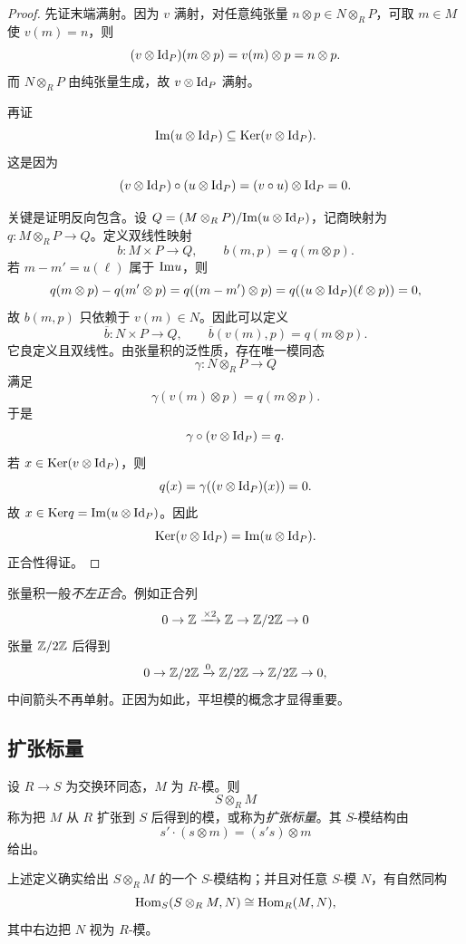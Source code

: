 \begin{proof}
先证末端满射。因为 $v$ 满射，对任意纯张量 $n\otimes p\in N\otimes_R P$，可取 $m\in M$ 使 $v(m)=n$，则
\[
(v\otimes \mathrm{Id}_P)(m\otimes p)=v(m)\otimes p=n\otimes p.
\]
而 $N\otimes_R P$ 由纯张量生成，故 $v\otimes \mathrm{Id}_P$ 满射。

再证
\[
\mathrm{Im}(u\otimes \mathrm{Id}_P)\subseteq \mathrm{Ker}(v\otimes \mathrm{Id}_P).
\]
这是因为
\[
(v\otimes \mathrm{Id}_P)\circ (u\otimes \mathrm{Id}_P)=(v\circ u)\otimes \mathrm{Id}_P=0.
\]

关键是证明反向包含。设 $Q=(M\otimes_R P)/\mathrm{Im}(u\otimes \mathrm{Id}_P)$，记商映射为 $q\colon M\otimes_R P\to Q$。定义双线性映射
\[
b\colon M\times P\to Q,
\qquad b(m,p)=q(m\otimes p).
\]
若 $m-m'=u(\ell)$ 属于 $\mathrm{Im} u$，则
\[
q(m\otimes p)-q(m'\otimes p)=q((m-m')\otimes p)=q((u\otimes \mathrm{Id}_P)(\ell\otimes p))=0,
\]
故 $b(m,p)$ 只依赖于 $v(m)\in N$。因此可以定义
\[
\overline b\colon N\times P\to Q,
\qquad \overline b(v(m),p)=q(m\otimes p).
\]
它良定义且双线性。由张量积的泛性质，存在唯一模同态
\[
\gamma\colon N\otimes_R P\to Q
\]
满足
\[
\gamma(v(m)\otimes p)=q(m\otimes p).
\]
于是
\[
\gamma\circ (v\otimes \mathrm{Id}_P)=q.
\]
若 $x\in \mathrm{Ker}(v\otimes \mathrm{Id}_P)$，则
\[
q(x)=\gamma((v\otimes \mathrm{Id}_P)(x))=0.
\]
故 $x\in \mathrm{Ker} q=\mathrm{Im}(u\otimes \mathrm{Id}_P)$。因此
\[
\mathrm{Ker}(v\otimes \mathrm{Id}_P)=\mathrm{Im}(u\otimes \mathrm{Id}_P).
\]
正合性得证。
\end{proof}

\begin{remark}
张量积一般\emph{不左正合}。例如正合列
\[
0\to \mathbb{Z}\xrightarrow{\times 2} \mathbb{Z}\to \mathbb{Z}/2\mathbb{Z}\to 0
\]
张量 $\mathbb{Z}/2\mathbb{Z}$ 后得到
\[
0\to \mathbb{Z}/2\mathbb{Z}\xrightarrow{0} \mathbb{Z}/2\mathbb{Z}\to \mathbb{Z}/2\mathbb{Z}\to 0,
\]
中间箭头不再单射。正因为如此，平坦模的概念才显得重要。
\end{remark}

\subsection{扩张标量}

\begin{definition}
设 $R\to S$ 为交换环同态，$M$ 为 $R$-模。则
\[
S\otimes_R M
\]
称为把 $M$ 从 $R$ 扩张到 $S$ 后得到的模，或称为\emph{扩张标量}。其 $S$-模结构由
\[
s'\cdot (s\otimes m)=(s's)\otimes m
\]
给出。
\end{definition}

\begin{proposition}
上述定义确实给出 $S\otimes_R M$ 的一个 $S$-模结构；并且对任意 $S$-模 $N$，有自然同构
\[
\mathrm{Hom}_S(S\otimes_R M,N)\cong \mathrm{Hom}_R(M,N),
\]
其中右边把 $N$ 视为 $R$-模。
\end{proposition}

